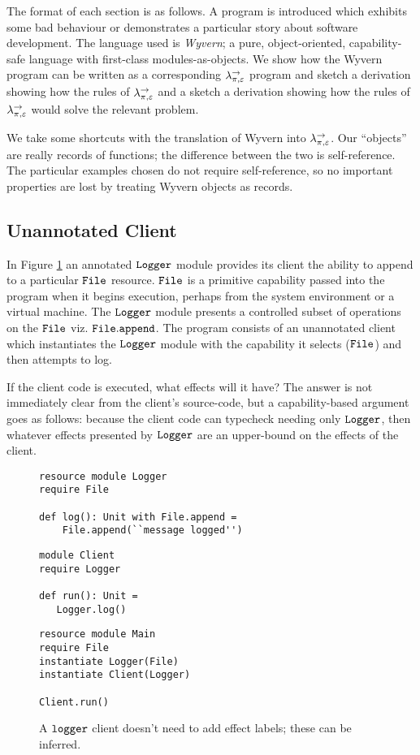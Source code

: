 The format of each section is as follows. A program is introduced which exhibits some bad behaviour or demonstrates a particular story about software development. The language used is \textit{Wyvern}; a pure, object-oriented, capability-safe language with first-class modules-as-objects. We show how the Wyvern program can be written as a corresponding $\lambda^{\rightarrow}_{\pi, \varepsilon}$ program and sketch a derivation showing how the rules of $\lambda^{\rightarrow}_{\pi, \varepsilon}$ and a sketch a derivation showing how the rules of $\lambda^{\rightarrow}_{\pi, \varepsilon}$ would solve the relevant problem.

We take some shortcuts with the translation of Wyvern into $\lambda^{\rightarrow}_{\pi, \varepsilon}$. Our ``objects'' are really records of functions; the difference between the two is self-reference. The particular examples chosen do not require self-reference, so no important properties are lost by treating Wyvern objects as records.

\subsection{Unannotated Client}

In Figure \ref{fig:eg1} an annotated $\mathtt{Logger}$ module provides its client the ability to append to a particular $\mathtt{File}$ resource. $\mathtt{File}$ is a primitive capability passed into the program when it begins execution, perhaps from the system environment or a virtual machine. The $\mathtt{Logger}$ module presents a controlled subset of operations on the $\mathtt{File}$ viz. $\mathtt{File.append}$. The program consists of an unannotated client which instantiates the $\mathtt{Logger}$ module with the capability it selects ($\mathtt{File}$) and then attempts to log.

If the client code is executed, what effects will it have? The answer is not immediately clear from the client's source-code, but a capability-based argument goes as follows: because the client code can typecheck needing only $\mathtt{Logger}$, then whatever effects presented by $\mathtt{Logger}$ are an upper-bound on the effects of the client.

\begin{figure}[h]

\begin{lstlisting}
resource module Logger
require File

def log(): Unit with File.append =
    File.append(``message logged'')
\end{lstlisting}

\begin{lstlisting}
module Client
require Logger

def run(): Unit =
   Logger.log()
\end{lstlisting}

\begin{lstlisting}
resource module Main
require File
instantiate Logger(File)
instantiate Client(Logger)

Client.run()
\end{lstlisting}

\caption{A $\mathtt{logger}$ client doesn't need to add effect labels; these can be inferred.}
\label{fig:eg1}
\end{figure}


